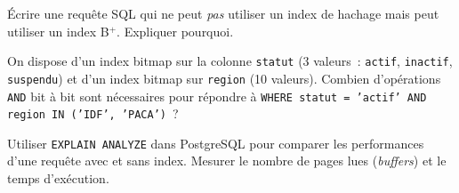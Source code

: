 \begin{exercice}
\'Ecrire une requ\^ete SQL qui ne peut \emph{pas} utiliser un index de
hachage mais peut utiliser un index B$^+$. Expliquer pourquoi.
\end{exercice}

\begin{exercice}
On dispose d'un index bitmap sur la colonne \texttt{statut} (3 valeurs~:
\texttt{actif}, \texttt{inactif}, \texttt{suspendu}) et d'un index bitmap
sur \texttt{region} (10 valeurs). Combien d'op\'erations \texttt{AND} bit
\`a bit sont n\'ecessaires pour r\'epondre \`a \texttt{WHERE statut = 'actif'
AND region IN ('IDF', 'PACA')}~?
\end{exercice}

\begin{exercice}
Utiliser \texttt{EXPLAIN ANALYZE} dans PostgreSQL pour comparer les
performances d'une requ\^ete avec et sans index. Mesurer le nombre de
pages lues (\emph{buffers}) et le temps d'ex\'ecution.
\end{exercice}
